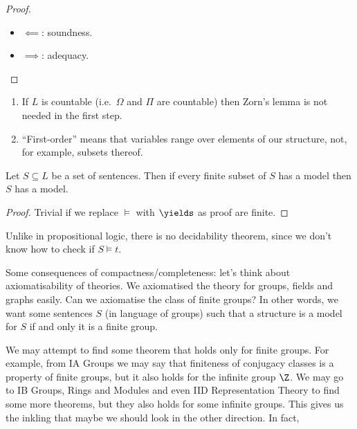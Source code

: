 \documentclass[a4paper]{article}
\begin{document}
\begin{proof}\leavevmode
  \begin{itemize}
  \item \(\impliedby\): soundness.
  \item \(\implies\): adequacy.
  \end{itemize}
\end{proof}

\begin{remark}\leavevmode
  \begin{enumerate}
  \item If \(L\) is countable (i.e.\ \(\Omega\) and \(\Pi\) are countable) then Zorn's lemma is not needed in the first step.
  \item ``First-order'' means that variables range over elements of our structure, not, for example, subsets thereof.
  \end{enumerate}
\end{remark}

\begin{theorem}[Compactness]
  Let \(S \subseteq L\) be a set of sentences. Then if every finite subset of \(S\) has a model then \(S\) has a model.
\end{theorem}

\begin{proof}
  Trivial if we replace \(\models\) with \(\yields\) as proof are finite.
\end{proof}

\begin{note}
  Unlike in propositional logic, there is no decidability theorem, since we don't know how to check if \(S \models t\).
\end{note}

Some consequences of compactness/completeness: let's think about axiomatisability of theories. We axiomatised the theory for groups, fields and graphs easily. Can we axiomatise the class of finite groups? In other words, we want some sentences \(S\) (in language of groups) such that a structure is a model for \(S\) if and only it is a finite group.

We may attempt to find some theorem that holds only for finite groups. For example, from IA Groups we may say that finiteness of conjugacy classes is a property of finite groups, but it also holds for the infinite group \(\Z\). We may go to IB Groups, Rings and Modules and even IID Representation Theory to find some more theorems, but they also holds for some infinite groups. This gives us the inkling that maybe we should look in the other direction. In fact,
\end{document}

